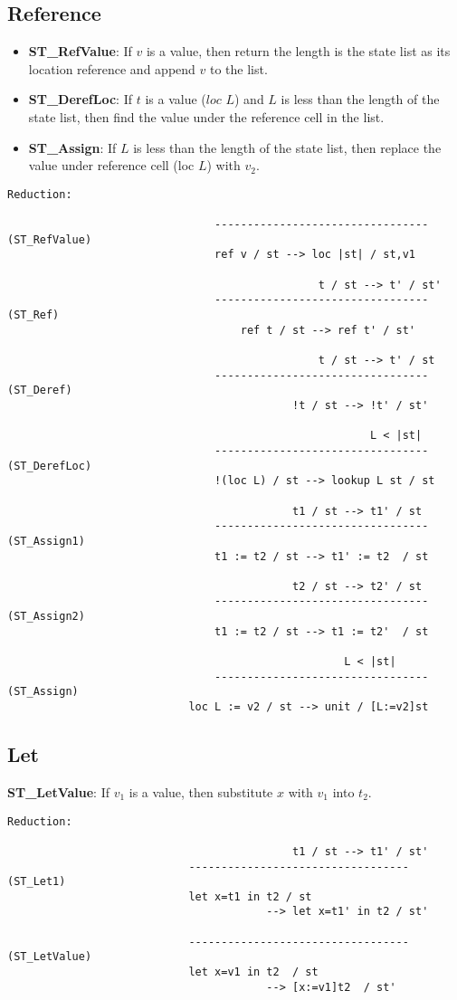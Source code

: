 \subsection{Reference}
\begin{itemize}
	\item \textbf{ST_RefValue}: If $v$ is a value, then return the length is the state list as its location reference and append $v$ to the list.
	\item \textbf{ST_DerefLoc}: If $t$ is a value ($loc$ $L$) and $L$ is less than the length of the state list, then find the value under the reference cell in the list.
	\item \textbf{ST_Assign}: If $L$ is less than the length of the state list, then replace the value under reference cell (loc $L$) with $v_2$.
\end{itemize}
\begin{lstlisting}
Reduction:

								---------------------------------  (ST_RefValue)
								ref v / st --> loc |st| / st,v1

												t / st --> t' / st'
								---------------------------------  (ST_Ref)
								    ref t / st --> ref t' / st'
								
												t / st --> t' / st
								---------------------------------  (ST_Deref)
											!t / st --> !t' / st'
								
														L < |st|
								---------------------------------  (ST_DerefLoc)
								!(loc L) / st --> lookup L st / st
								
											t1 / st --> t1' / st
								---------------------------------  (ST_Assign1)
								t1 := t2 / st --> t1' := t2  / st
								
											t2 / st --> t2' / st
								---------------------------------  (ST_Assign2)
								t1 := t2 / st --> t1 := t2'  / st
								
													L < |st|
								---------------------------------  (ST_Assign)
							loc L := v2 / st --> unit / [L:=v2]st

\end{lstlisting}

\subsection{Let}
\textbf{ST_LetValue}: If $v_1$ is a value, then substitute $x$ with $v_1$ into $t_2$.
\begin{lstlisting}
Reduction:

											t1 / st --> t1' / st'
							----------------------------------  (ST_Let1)
							let x=t1 in t2 / st 
										--> let x=t1' in t2 / st'
						
							----------------------------------  (ST_LetValue)
							let x=v1 in t2  / st 
										--> [x:=v1]t2  / st'
\end{lstlisting}

